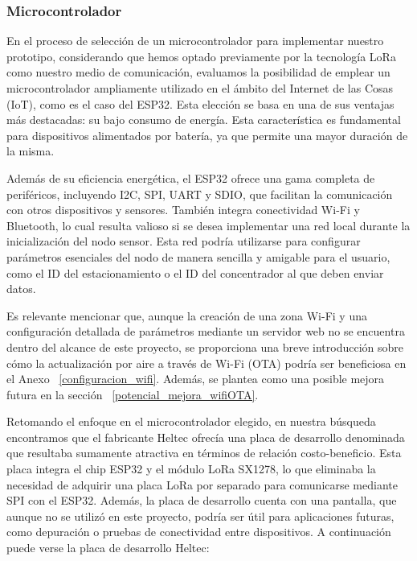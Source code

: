 \subsubsection{Microcontrolador}
En el proceso de selección de un microcontrolador para implementar nuestro prototipo, considerando que hemos optado previamente por la tecnología LoRa como nuestro medio de comunicación, evaluamos la posibilidad de emplear un microcontrolador ampliamente utilizado en el ámbito del Internet de las Cosas (IoT), como es el caso del ESP32. Esta elección se basa en una de sus ventajas más destacadas: su bajo consumo de energía. Esta característica es fundamental para dispositivos alimentados por batería, ya que permite una mayor duración de la misma.

Además de su eficiencia energética, el ESP32 ofrece una gama completa de periféricos, incluyendo I2C, SPI, UART y SDIO, que facilitan la comunicación con otros dispositivos y sensores. También integra conectividad Wi-Fi y Bluetooth, lo cual resulta valioso si se desea implementar una red local durante la inicialización del nodo sensor. Esta red podría utilizarse para configurar parámetros esenciales del nodo de manera sencilla y amigable para el usuario, como el ID del estacionamiento o el ID del concentrador al que deben enviar datos.

Es relevante mencionar que, aunque la creación de una zona Wi-Fi y una configuración detallada de parámetros mediante un servidor web no se encuentra dentro del alcance de este proyecto, se proporciona una breve introducción sobre cómo la actualización por aire a través de Wi-Fi (OTA) podría ser beneficiosa en el Anexo ~\ref{configuracion_wifi}. Además, se plantea como una posible mejora futura en la sección ~\ref{potencial_mejora_wifiOTA}.

Retomando el enfoque en el microcontrolador elegido, en nuestra búsqueda encontramos que el fabricante Heltec ofrecía una placa de desarrollo denominada  que resultaba sumamente atractiva en términos de relación costo-beneficio. Esta placa integra el chip ESP32 y el módulo LoRa SX1278, lo que eliminaba la necesidad de adquirir una placa LoRa por separado para comunicarse mediante SPI con el ESP32. Además, la placa de desarrollo cuenta con una pantalla, que aunque no se utilizó en este proyecto, podría ser útil para aplicaciones futuras, como depuración o pruebas de conectividad entre dispositivos. A continuación puede verse la placa de desarrollo Heltec:

